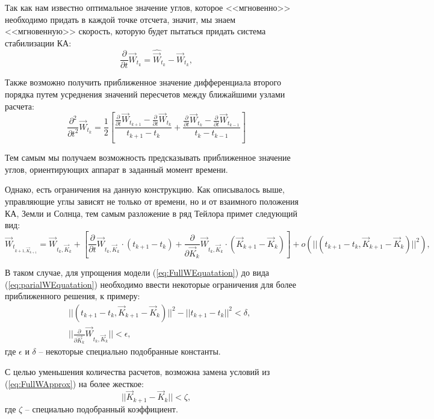   Так как нам известно оптимальное значение углов, которое <<мгновенно>> необходимо
придать в каждой точке отсчета, значит, мы знаем <<мгновенную>> скорость, которую
будет пытаться придать система стабилизации КА:
\begin{equation}
  \frac{\partial}{\partial t}\vec{W}_{t_{k}} = \hat{\vec{W}}_{t_{k}} - \vec{W}_{t_{k}},
\end{equation}\par
  Также возможно получить приближенное значение дифференциала второго порядка путем
усреднения значений пересчетов между ближайшими узлами расчета:
\begin{equation}
  \frac{\partial^2}{\partial t^2}\vec{W}_{t_{k}} = \frac{1}{2}\left[
    \frac{\frac{\partial}{\partial t}\vec{W}_{t_{k+1}} - \frac{\partial}{\partial t}\vec{W}_{t_{k}}}{t_{k+1} - t_{k}}
    +
    \frac{\frac{\partial}{\partial t}\vec{W}_{t_{k}} - \frac{\partial}{\partial t}\vec{W}_{t_{k-1}}}{t_{k} - t_{k-1}}
  \right]
\end{equation}\par
  Тем самым мы получаем возможность предсказывать приближенное значение углов,
ориентирующих аппарат в заданный момент времени.\par
  Однако, есть ограничения на данную конструкцию. Как описывалось выше, управляющие
углы зависят не только от времени, но и от взаимного положения КА, Земли и Солнца,
тем самым разложение в ряд Тейлора примет следующий вид:
\begin{equation} \label{eq:FullWEquatation}
  \vec{W}_{t_{k+1,\vec{K}_{k+1}}} = \vec{W}_{t_{k},\vec{K}_{k}}
  + \left[
    \frac{\partial}{\partial t}\vec{W}_{t_{k},\vec{K}_{k}} \cdot (t_{k+1} - t_{k})
  + \frac{\partial}{\partial \vec{K}_k}\vec{W}_{t_{k},\vec{K}_{k}} \cdot (\vec{K}_{k+1} - \vec{K}_{k})
  \right]
  + o(||(t_{k+1} - t_{k}, \vec{K}_{k+1} - \vec{K}_{k})||^2),
\end{equation}\par
  В таком случае, для упрощения модели (\ref{eq:FullWEquatation}) до вида (\ref{eq:parialWEquatation})
необходимо ввести некоторые ограничения для более приближенного решения, к примеру:
\begin{equation} \label{eq:FullWApprox}
  \begin{aligned}
    &||(t_{k+1} - t_{k}, \vec{K}_{k+1} - \vec{K}_{k})||^2 - ||t_{k+1} - t_{k}||^2 < \delta,\\
    &||\frac{\partial}{\partial \vec{K}_k}\vec{W}_{t_{k},\vec{K}_{k}}|| < \epsilon,
  \end{aligned}
\end{equation}
где $\epsilon$ и $\delta$ -- некоторые специально подобранные константы.\par
  С целью уменьшения количества расчетов, возможна замена условий из (\ref{eq:FullWApprox})
на более жесткое:
\begin{equation}
  ||\vec{K}_{k+1} - \vec{K}_{k}|| < \zeta,
\end{equation}
где $\zeta$ -- специально подобранный коэффициент.
